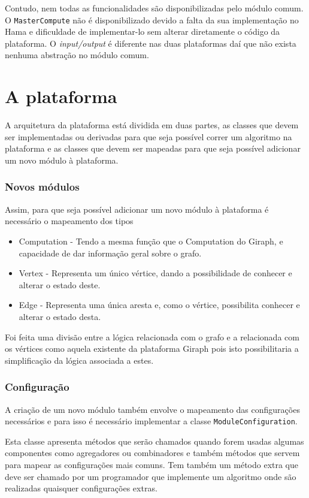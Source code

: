 Contudo, nem todas as funcionalidades são disponibilizadas pelo módulo comum.
O \texttt{MasterCompute} não é disponibilizado devido a falta da sua implementação no Hama e dificuldade
de implementar-lo sem alterar diretamente o código da plataforma.
O \textit{input/output} é diferente nas 
duas plataformas daí que não exista nenhuma abstração no módulo comum.



\section{A plataforma}
A arquitetura da plataforma está dividida em duas partes, as classes que devem ser implementadas ou derivadas para que seja possível correr um algoritmo na plataforma e as classes que devem ser mapeadas para que seja possível adicionar um novo módulo à plataforma.

\subsubsection*{Novos módulos}

Assim, para que seja possível adicionar um novo módulo à plataforma é necessário o mapeamento dos tipos
\begin{itemize}
	\item Computation - Tendo a mesma função que o Computation do Giraph, e capacidade de dar informação geral sobre o grafo.
	\item Vertex - Representa um único vértice, dando a possibilidade de conhecer e alterar o estado deste.
	\item Edge - Representa uma única aresta e, como o vértice, possibilita conhecer e alterar o estado desta.
\end{itemize}
Foi feita uma divisão entre a lógica relacionada com o grafo e a relacionada com os vértices como aquela existente da plataforma Giraph pois isto possibilitaria a simplificação da lógica associada a estes.

\subsubsection*{Configuração}
A criação de um novo módulo também envolve o mapeamento das configurações necessários e para isso é necessário implementar a classe \texttt{ModuleConfiguration}.

Esta classe apresenta métodos que serão chamados quando forem usadas algumas componentes como agregadores ou combinadores e também métodos que servem para mapear as configurações mais comuns. 
Tem também um método extra que deve ser chamado por um programador que implemente um algoritmo onde são realizadas quaisquer configurações extras.

